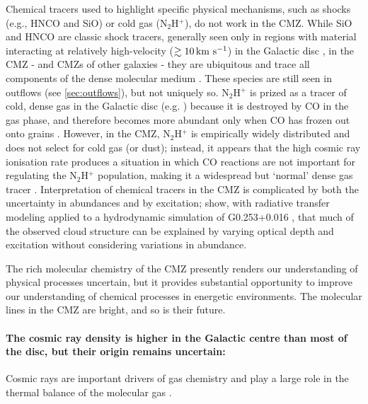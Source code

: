 Chemical tracers used to highlight specific physical mechanisms, such as shocks (e.g., HNCO and SiO) or cold gas (N$_2$H$^+$), do not work in the CMZ.
While SiO and HNCO are classic shock tracers, generally seen only in regions with material interacting at relatively high-velocity ($\gtrsim10\,\mbox{${\rm km}~{\rm s}^{-1}$}$) in the Galactic disc \citep[e.g.,][]{Schilke1997,Jimenez-Serra2008,Gusdorf2008}, in the CMZ - and CMZs of other galaxies - they are ubiquitous and trace all components of the dense molecular medium \citep{Jones2012,Henshaw2016a,Henshaw2019,Yu2018}.
These species are still seen in outflows (see \ref{sec:outflows}), but not uniquely so.
N$_2$H$^{+}$ is prized as a tracer of cold, dense gas in the Galactic disc (e.g. \citealp{Barnes2020a}) because it is destroyed by CO in the gas phase, and therefore becomes more abundant only when CO has frozen out onto grains \citep{Flower2005,Bergin2007}.  However, in the CMZ, N$_2$H$^+$ is empirically widely distributed and does not select for cold gas (or dust); instead, it appears that the high cosmic ray ionisation rate produces a situation in which CO reactions are not important for regulating the N$_2$H$^+$ population, making it a widespread but `normal' dense gas tracer \citep{Santa-Maria2021}.
Interpretation of chemical tracers in the CMZ is complicated by both the uncertainty in abundances and by excitation; \citet{Petkova2021} show, with radiative transfer modeling applied to a hydrodynamic simulation of G0.253+0.016 \citep{Dale2019, Kruijssen2019}, that much of the observed cloud structure can be explained by varying optical depth and excitation without considering variations in abundance.  

The rich molecular chemistry of the CMZ presently renders our understanding of physical processes uncertain, but it provides substantial opportunity to improve our understanding of chemical processes in energetic environments.
The molecular lines in the CMZ are bright, and so is their future.

\paragraph{The cosmic ray density is higher in the Galactic centre than most of the disc, but their origin remains uncertain:}\label{sec:cosmicrays}
Cosmic rays are important drivers of gas chemistry and play a large role in the thermal balance of the molecular gas \citep[see][for a review of cosmic rays in star formation; they discuss the CMZ in S7.3]{Padovani2020}.

